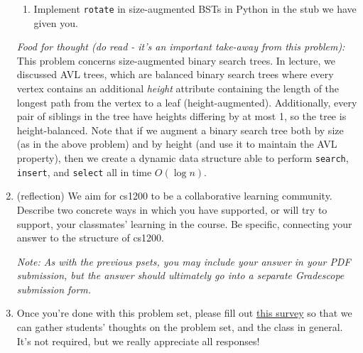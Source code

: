 \documentclass[11pt]{article}
\begin{document}
\begin{enumerate}
\begin{enumerate}
        \item Implement \texttt{rotate} in size-augmented BSTs in Python in the stub we have given you.
    
    \end{enumerate}
    
    \emph{Food for thought (do read - it's an important take-away from this problem):} This problem concerns size-augmented binary search trees. In lecture, we discussed AVL trees, which are balanced binary search trees where every vertex contains an additional \textit{height} attribute containing the length of the longest path from the vertex to a leaf (height-augmented). Additionally, every pair of siblings in the tree have heights differing by at most 1, so the tree is height-balanced. Note that if we augment a binary search tree both by size (as in the above problem) and by height (and use it to maintain the AVL property), then we create a dynamic data structure able to perform \texttt{search}, \texttt{insert}, and \texttt{select} all in time $O(\log n)$. 


\item (reflection) We aim for cs1200 to be a collaborative learning community. Describe two concrete ways in which you have supported, or will try to support, your classmates' learning in the course.  Be specific, connecting your answer to the structure of cs1200. 

\textit{Note: As with the previous psets, you may include your answer in your PDF submission, but the answer should ultimately go into a separate Gradescope submission form.}

\item Once you're done with this problem set, please fill out \href{https://forms.gle/pyhGJ73HpodhThNP9}{this survey} so that we can gather students' thoughts on the problem set, and the class in general. It's not required, but we really appreciate all responses!

\end{enumerate}
\end{document}
